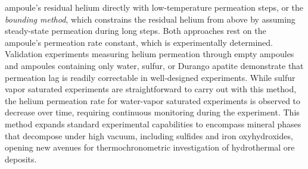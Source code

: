 ampoule's residual helium directly with low-temperature permeation steps, or the \emph{bounding method}, 
which constrains the residual helium from above by assuming steady-state permeation during long steps. 
Both approaches rest on the ampoule's permeation rate constant, which is experimentally determined. 
Validation experiments measuring helium permeation through empty ampoules and ampoules 
containing only water, sulfur, or Durango apatite demonstrate that permeation lag is readily 
correctable in well-designed experiments. While sulfur vapor saturated experiments are 
straightforward to carry out with this method, the helium permeation rate for water-vapor saturated 
experiments is observed to decrease over time, requiring continuous monitoring during the experiment. 
This method expands standard experimental capabilities to encompass mineral phases that decompose 
under high vacuum, including sulfides and iron oxyhydroxides, opening new avenues for thermochronometric 
investigation of hydrothermal ore deposits.

